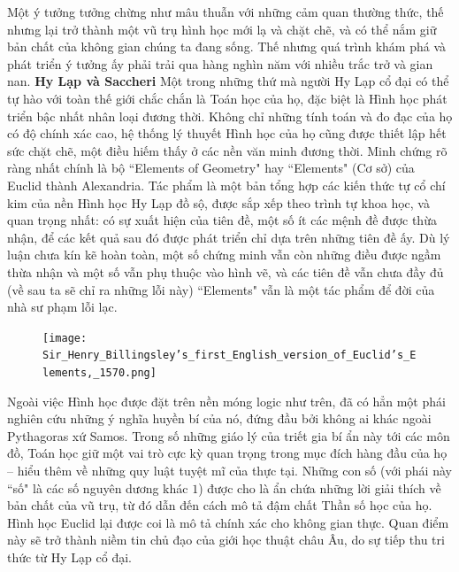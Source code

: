\begin{multicols}{2}		
	Một ý tưởng tưởng chừng như mâu thuẫn với những cảm quan thường thức, thế nhưng lại trở thành một vũ trụ hình học mới lạ và chặt chẽ, và có thể nắm giữ bản chất của không gian chúng ta đang sống. Thế nhưng quá trình khám phá và phát triển ý tưởng ấy phải trải qua hàng nghìn năm với nhiều trắc trở và gian nan.
	\vskip 0.1cm
	\textbf{\color{lichsutoanhoc}Hy Lạp và Saccheri}
	\vskip 0.1cm
	Một trong những thứ mà người Hy Lạp cổ đại có thể tự hào với toàn thế giới chắc chắn là Toán học của họ, đặc biệt là Hình học phát triển bậc nhất nhân loại đương thời. Không chỉ những tính toán và đo đạc của họ có độ chính xác cao, hệ thống lý thuyết Hình học của họ cũng được thiết lập hết sức chặt chẽ, một điều hiếm thấy ở các nền văn minh đương thời. Minh chứng rõ ràng nhất chính là bộ ``Elements of Geometry" hay ``Elements" (Cơ sở) của Euclid thành Alexandria. Tác phẩm là một bản tổng hợp các kiến thức tự cổ chí kim của nền Hình học Hy Lạp đồ sộ, được sắp xếp theo trình tự khoa học, và quan trọng nhất: có sự xuất hiện của tiên đề, một số ít các mệnh đề được thừa nhận, để các kết quả sau đó được phát triển chỉ dựa trên những tiên đề ấy. Dù lý luận chưa kín kẽ hoàn toàn, một số chứng minh vẫn còn những điều được ngầm thừa nhận và một số vẫn phụ thuộc vào hình vẽ, và các tiên đề vẫn chưa đầy đủ (về sau ta sẽ chỉ ra những lỗi này) ``Elements" vẫn là một tác phẩm để đời của nhà sư phạm lỗi lạc. 
	\begin{figure}[H]
		\vspace*{-5pt}
		\centering
		\captionsetup{labelformat= empty, justification=centering}
		\texttt{[image: Sir\_Henry\_Billingsley's\_first\_English\_version\_of\_Euclid's\_Elements,\_1570.png]}
		\vspace*{-15pt}
	\end{figure}
	Ngoài việc Hình học được đặt trên nền móng logic như trên, đã có hẳn một phái nghiên cứu những ý nghĩa huyền bí của nó, đứng đầu bởi không ai khác ngoài Pythagoras xứ Samos. Trong số những giáo lý của triết gia bí ẩn này tới các môn đồ, Toán học giữ một vai trò cực kỳ quan trọng trong mục đích hàng đầu của họ -- hiểu thêm về những quy luật tuyệt mĩ của thực tại. Những con số (với phái này ``số" là các số nguyên dương khác $1$) được cho là ẩn chứa những lời giải thích về bản chất của vũ trụ, từ đó dẫn đến cách mô tả đậm chất Thần số học của họ. Hình học Euclid lại được coi là mô tả chính xác cho không gian thực. Quan điểm này sẽ trở thành niềm tin chủ đạo của giới học thuật châu Âu, do sự tiếp thu tri thức từ Hy Lạp cổ đại.

\end{multicols}
